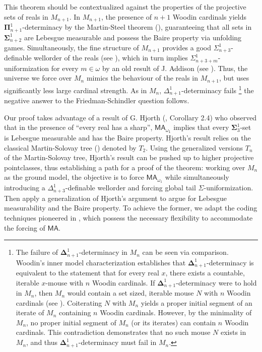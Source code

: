 \documentclass[a4paper,11pt]{article}
\newcommand{\MA}{\mathsf{MA_{\omega_1}}}
\begin{document}
This theorem should be contextualized against the properties of the projective sets of reals in $M_{n+1}$. In $M_{n+1}$, the presence of $n+1$ Woodin cardinals yields $\boldsymbol{\Pi}^1_{n+1}$-determinacy by the Martin-Steel theorem (\cite{martin1989proof}), guaranteeing that all sets in $\boldsymbol{\Sigma}^1_{n+2}$ are Lebesgue measurable and possess the Baire property via unfolding games. Simultaneously, the fine structure of $M_{n+1}$ provides a good $\Sigma^1_{n+3}$-definable wellorder of the reals (see \cite{Steel2}), which in turn implies $\Sigma^1_{n+3+m}$-uniformization for every $m \in \omega$ by an old result of J. Addison (see \cite{Addison}). Thus, the universe we force over $M_n$ mimics the behaviour of the reals in $M_{n+1}$, but uses significantly less large cardinal strength. As in $M_n$, $\Delta^1_{n+1}$-determinacy fails \footnote{The failure of $\boldsymbol{\Delta}^1_{n+1}$-determinacy in $M_n$ can be seen via comparison. Woodin's inner model characterization establishes that $\boldsymbol{\Delta}^1_{n+1}$-determinacy is equivalent to the statement that for every real $x$, there exists a countable, iterable $x$-mouse with $n$ Woodin cardinals. If $\boldsymbol{\Delta}^1_{n+1}$-determinacy were to hold in $M_n$, then $M_n$ would contain a set sized, iterable mouse $N$ with $n$ Woodin cardinals (see \cite{muller2020mice}). Coiterating $N$ with $M_n$ yields a proper initial segment of an iterate of $M_n$ containing $n$ Woodin cardinals. However, by the minimality of $M_n$, no proper initial segment of $M_n$ (or its iterates) can contain $n$ Woodin cardinals. This contradiction demonstrates that no such mouse $N$ exists in $M_n$, and thus $\boldsymbol{\Delta}^1_{n+1}$-determinacy must fail in $M_n$.} the negative answer to the Friedman-Schindler question follows.

Our proof takes advantage of a result of G. Hjorth (\cite{Hjorth}, Corollary 2.4) who observed that in the presence of ``every real has a sharp'', $\MA$ implies that every $\boldsymbol{\Sigma}^1_3$-set is Lebesgue measurable and has the Baire property. Hjorth's result relies on the classical Martin-Solovay tree (\cite{martin1969basis}) denoted by $T_2$. Using the generalized versions $T_n$ of the Martin-Solovay tree, Hjorth's result can be pushed up to higher projective pointclasses, thus establishing a path for a proof of the theorem: working over $M_n$ as the ground model, the objective is to force $\mathsf{MA}_{\omega_1}$ while simultaneously introducing a $\Delta^1_{n+3}$-definable wellorder and forcing global tail $\Sigma$-uniformization. Then apply a generalization of Hjorth's argument to argue for Lebesgue measurability and the Baire property. To achieve the former, we adapt the coding techniques pioneered in \cite{BPFA_and_global_Sigma-uniformization}, which possess the necessary flexibility to accommodate the forcing of $\mathsf{MA}$. 
\end{document}
